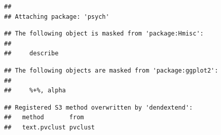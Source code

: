 \documentclass[]{article}
\newenvironment{Shaded}{\begin{snugshade}}{\end{snugshade}}
\newcommand{\DecValTok}[1]{\textcolor[rgb]{0.00,0.00,0.81}{#1}}
\newcommand{\KeywordTok}[1]{\textcolor[rgb]{0.13,0.29,0.53}{\textbf{#1}}}
\newcommand{\NormalTok}[1]{#1}
\newcommand{\OperatorTok}[1]{\textcolor[rgb]{0.81,0.36,0.00}{\textbf{#1}}}
\newcommand{\StringTok}[1]{\textcolor[rgb]{0.31,0.60,0.02}{#1}}
\begin{document}
\begin{verbatim}
## 
## Attaching package: 'psych'
\end{verbatim}

\begin{verbatim}
## The following object is masked from 'package:Hmisc':
## 
##     describe
\end{verbatim}

\begin{verbatim}
## The following objects are masked from 'package:ggplot2':
## 
##     %+%, alpha
\end{verbatim}

\begin{Shaded}
\end{Shaded}

\begin{verbatim}
## Registered S3 method overwritten by 'dendextend':
##   method       from   
##   text.pvclust pvclust
\end{verbatim}
\end{document}
